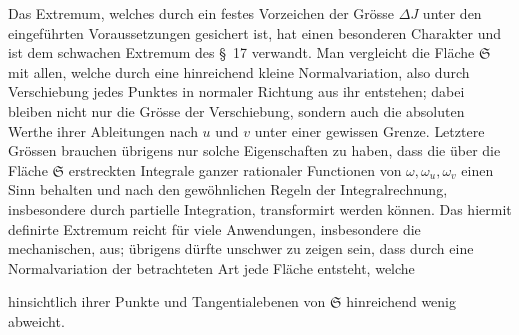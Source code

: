 \documentclass[11pt,a4paper,leqno]{article}
\begin{document}
Das Extremum, welches durch ein festes Vorzeichen der Grösse $\Delta J$ unter
den eingeführten Voraussetzungen gesichert ist, hat einen besonderen
Charakter und ist dem schwachen Extremum des \S~17 verwandt. Man vergleicht
die Fläche $\mathfrak{S}$ mit allen, welche durch eine hinreichend kleine
Normalvariation, also durch Verschiebung jedes Punktes in normaler Richtung
aus ihr entstehen; dabei bleiben nicht nur die Grösse der Verschiebung,
sondern auch die absoluten Werthe ihrer Ableitungen nach $u$ und $v$ unter
einer gewissen Grenze. Letztere Grössen brauchen übrigens nur solche
Eigenschaften zu haben, dass die über die Fläche $\mathfrak{S}$ erstreckten
Integrale ganzer rationaler Functionen von $\omega,\omega_u,\omega_v$ einen
Sinn behalten und nach den gewöhnlichen Regeln der Integralrechnung,
insbesondere durch partielle Integration, transformirt werden können. Das
hiermit definirte Extremum reicht für viele Anwendungen, insbesondere die
mechanischen, aus; übrigens dürfte unschwer zu zeigen sein, dass durch eine
Normalvariation der betrachteten Art jede Fläche entsteht, welche

hinsichtlich ihrer Punkte und Tangentialebenen von $\mathfrak{S}$ hinreichend
wenig abweicht.
\end{document}
